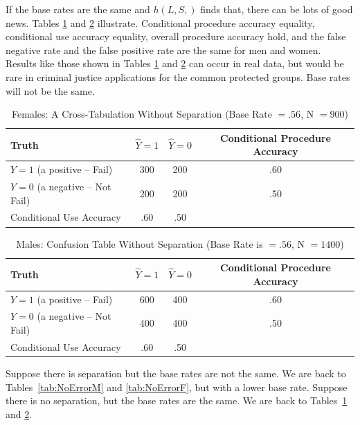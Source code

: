 \documentclass[12pt]{article}
\begin{document}
If the base rates are the same and $h(L,S,)$ finds that, there can be lots of good news. Tables \ref{tab:EqualF} and \ref{tab:EqualM} illustrate. Conditional procedure accuracy equality, conditional use accuracy equality, overall procedure accuracy hold, and the false negative rate and the false positive rate are the same for men and women. Results like those shown in Tables \ref{tab:EqualF} and \ref{tab:EqualM} can occur in real data, but would be rare in criminal justice applications for the common protected groups. Base rates will not be the same.

\begin{table}[htbp]
\footnotesize
\caption{Females: A Cross-Tabulation Without Separation (Base Rate $=.56$, N $=900$)}
\begin{center}
\begin{tabular}{|l|c|c|c|}
\hline \hline
Truth & $\hat{Y} = 1$ & $\hat{Y} = 0$ & Conditional Procedure Accuracy  \\
\hline
$ Y=1$ (a positive -- Fail) & 300 & 200  & .60 \\
\hline
$Y = 0$  (a negative -- Not Fail)& 200 & 200  & .50 \\
\hline
Conditional Use Accuracy & .60 & .50 & \\
\hline
\hline
\end{tabular}
\end{center}
\label{tab:EqualF}
\end{table}

\begin{table}[htbp]
\footnotesize
\caption{Males: Confusion Table Without Separation (Base Rate is $=.56$, N $= 1400$)}
\begin{center}
\begin{tabular}{|l|c|c|c|}
\hline \hline
Truth & $\hat{Y} = 1$ & $\hat{Y} = 0$ & Conditional Procedure Accuracy  \\
\hline
$ Y=1$ (a positive -- Fail) & 600 & 400  & .60 \\
\hline
$Y = 0$  (a negative -- Not Fail) & 400 & 400  & .50 \\
\hline
Conditional Use Accuracy & .60 & .50 & \\
\hline
\hline
\end{tabular}
\end{center}
\label{tab:EqualM}
\end{table}

Suppose there is separation but the base rates are not the same. We are back to Tables~\ref{tab:NoErrorM} and \ref{tab:NoErrorF}, but with a lower base rate. Suppose there is no separation, but the base rates are the same. We are back to Tables~\ref{tab:EqualF} and \ref{tab:EqualM}.
\end{document}
